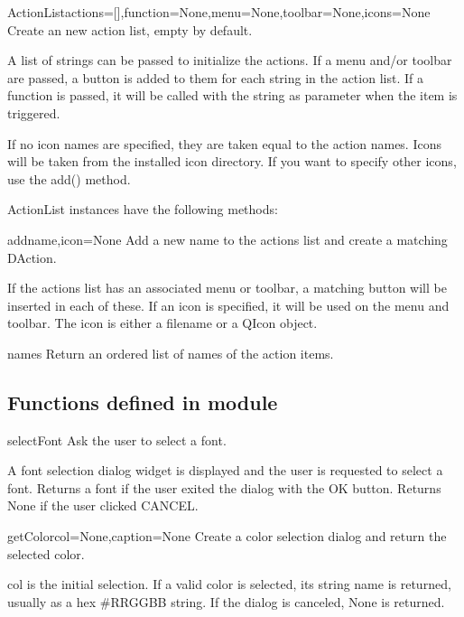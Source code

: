 \begin{classdesc}{ActionList}{actions=[],function=None,menu=None,toolbar=None,icons=None}
Create an new action list, empty by default.

        A list of strings can be passed to initialize the actions.
        If a menu and/or toolbar are passed, a button is added to them
        for each string in the action list.
        If a function is passed, it will be called with the string as
        parameter when the item is triggered.

        If no icon names are specified, they are taken equal to the
        action names. Icons will be taken from the installed icon directory.
        If you want to specify other icons, use the add() method.
        
\end{classdesc}

ActionList instances have the following methods:

\begin{funcdesc}{add}{name,icon=None}
Add a new name to the actions list and create a matching DAction.

        If the actions list has an associated menu or toolbar,
        a matching button will be inserted in each of these.
        If an icon is specified, it will be used on the menu and toolbar.
        The icon is either a filename or a QIcon object. 
        
\end{funcdesc}

\begin{funcdesc}{names}{}
Return an ordered list of names of the action items.
\end{funcdesc}

\subsection{Functions defined in module }

\begin{funcdesc}{selectFont}{}
Ask the user to select a font.

    A font selection dialog widget is displayed and the user is requested
    to select a font.
    Returns a font if the user exited the dialog with the OK button.
    Returns None if the user clicked CANCEL.
    
\end{funcdesc}

\begin{funcdesc}{getColor}{col=None,caption=None}
Create a color selection dialog and return the selected color.

    col is the initial selection.
    If a valid color is selected, its string name is returned, usually as
    a hex \#RRGGBB string. If the dialog is canceled, None is returned.
    
\end{funcdesc}

